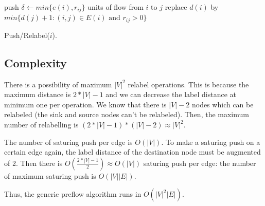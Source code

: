 \begin{algorithm}
  {push $\delta\gets min\{e(i), r_{ij}\}$ units of flow from $i$ to $j$\;}
\Else
   {replace $d(i)$ by $min\{d(j)+1 : (i, j) \in E(i) \text{ and } r_{ij} > 0 \}$\;}
\caption{Push/Relabel($i$).}
\end{algorithm}

\subsection{Complexity}

There is a possibility of maximum $|V|^2$ relabel operations. This is because the maximum distance is $2*|V| - 1$ and we can decrease the label distance at minimum one per operation. We know that there is $|V| - 2$ nodes which can be relabeled (the sink and source nodes can't be relabeled). Then, the maximum number of relabelling is $(2*|V| - 1) * (|V| - 2) \approx |V|^2$.%

The number of saturing push per edge is $O(|V|)$. To make a saturing push on a certain edge again, the label distance of the destination node must be augmented of 2. Then there is $O(\frac{2*|V| - 1}{2}) \approx O(|V|)$ saturing push per edge: the number of maximum saturing push is $O(|V||E|)$.

Thus, the generic preflow algorithm runs in $O(|V|^2 |E|)$. %